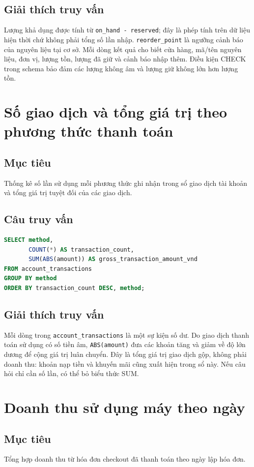 \subsection*{Giải thích truy vấn}
Lượng khả dụng được tính từ \texttt{on\_hand - reserved}; đây là phép tính trên dữ liệu hiện thời chứ không phải tổng số lần nhập. \texttt{reorder\_point} là ngưỡng cảnh báo của nguyên liệu tại cơ sở. Mỗi dòng kết quả cho biết cửa hàng, mã/tên nguyên liệu, đơn vị, lượng tồn, lượng đã giữ và cảnh báo nhập thêm. Điều kiện CHECK trong schema bảo đảm các lượng không âm và lượng giữ không lớn hơn lượng tồn.

\section{Số giao dịch và tổng giá trị theo phương thức thanh toán}
\subsection*{Mục tiêu}
Thống kê số lần sử dụng mỗi phương thức ghi nhận trong sổ giao dịch tài khoản và tổng giá trị tuyệt đối của các giao dịch.

\subsection*{Câu truy vấn}
\begin{lstlisting}[language=SQL]
SELECT method,
       COUNT(*) AS transaction_count,
       SUM(ABS(amount)) AS gross_transaction_amount_vnd
FROM account_transactions
GROUP BY method
ORDER BY transaction_count DESC, method;
\end{lstlisting}

\subsection*{Giải thích truy vấn}
Mỗi dòng trong \texttt{account\_transactions} là một sự kiện số dư. Do giao dịch thanh toán sử dụng có số tiền âm, \texttt{ABS(amount)} đưa các khoản tăng và giảm về độ lớn dương để cộng giá trị luân chuyển. Đây là tổng giá trị giao dịch gộp, không phải doanh thu: khoản nạp tiền và khuyến mãi cũng xuất hiện trong sổ này. Nếu câu hỏi chỉ cần số lần, có thể bỏ biểu thức SUM.

\section{Doanh thu sử dụng máy theo ngày}
\subsection*{Mục tiêu}
Tổng hợp doanh thu từ hóa đơn checkout đã thanh toán theo ngày lập hóa đơn.

